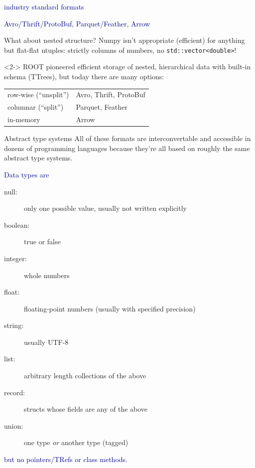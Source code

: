 \documentclass{beamer}
\begin{document}
\begin{frame}{}
\begin{center}
\LARGE \textcolor{darkblue}{industry standard formats}

\vspace{0.25 cm}
\textcolor{darkblue}{\Large Avro/Thrift/ProtoBuf, Parquet/Feather, Arrow}
\end{center}
\end{frame}

\begin{frame}{What about nested structure?}
Numpy isn't appropriate (efficient) for anything but flat-flat ntuples: strictly columns of numbers, no {\tt\small std::vector<double>}!

\vspace{0.25 cm}
\begin{uncoverenv}<2->
ROOT pioneered efficient storage of nested, hierarchical data with built-in schema (TTrees), but today there are many options:

\begin{center}
\begin{tabular}{l l}
row-wise (``unsplit'') & Avro, Thrift, ProtoBuf \\
columnar (``split'') & Parquet, Feather \\
in-memory & Arrow
\end{tabular}
\end{center}
\end{uncoverenv}
\end{frame}

\begin{frame}{Abstract type systems}
\vspace{0.25 cm}
All of these formats are interconvertable and accessible in dozens of programming languages because they're all based on roughly the same abstract type systems.

\vspace{0.25 cm}
\textcolor{darkblue}{Data types are}
\begin{description}
\item[null:] only one possible value, usually not written explicitly
\item[boolean:] true or false
\item[integer:] whole numbers
\item[float:] floating-point numbers (usually with specified precision)
\item[string:] usually UTF-8
\item[list:] arbitrary length collections of the above
\item[record:] structs whose fields are any of the above
\item[union:] one type {\it or} another type (tagged)
\end{description}
\textcolor{darkblue}{but no pointers/TRefs or class methods.}
\end{frame}
\end{document}
